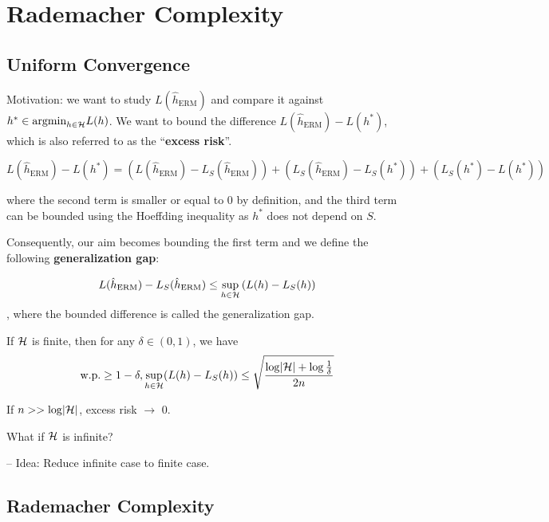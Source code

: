 
\newcommand{\hERM}{\hat{h}_{\text{ERM}}}

\chapter{Rademacher Complexity}


\section{Uniform Convergence}

Motivation: we want to study \(L(\hERM)\) and compare it against 
\(h^* \in \text{argmin}_{h \in \mathcal{H}} L(h)\). We want to bound the 
difference \(L(\hERM) - L(h^*)\), which is also referred to as the ``\textbf{excess risk}''. 


\[
  L(\hERM) - L(h^*) = \left(L(\hERM) - L_S(\hERM)\right) + 
  \left( L_S(\hERM) - L_S(h^*) \right) + \left(L_S(h^*) - L(h^*)\right) 
\]

where the second term is smaller or equal to 0 by definition, and the third term can be bounded 
using the Hoeffding inequality as \(h^*\) does not depend on \(S\). 

Consequently, our aim becomes bounding the first term and we define the following 
\textbf{generalization gap}: 

\begin{definition}
    \[L(\hERM) - L_S (\hERM) \leq \sup_{h \in \Hcal} \left(L(h) - L_S(h)\right)\], 
    where the bounded difference is called the generalization gap. 
\end{definition}

\begin{theorem}
    If \(\mathcal{H}\) is finite, then for any \(\delta \in (0, 1)\), we have 
    \[
        \text{w.p.} \geq 1 - \delta, \sup_{h \in \mathcal{H}} (L(h) - L_S(h)) \leq \sqrt{\frac{\log \lvert \mathcal{H} \rvert + \log \frac{1}{\delta}}{2n}}  
    \]
\end{theorem}


\begin{remark}
    If \(n >> \log \lvert \mathcal{H} \rvert\), excess risk \(\to\) 0. 
\end{remark}

What if \(\mathcal{H}\) is infinite? 

-- Idea: Reduce infinite case to finite case. 


\section{Rademacher Complexity}


